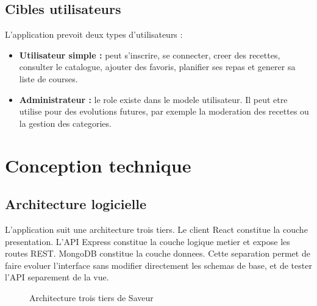 \documentclass[12pt,a4paper]{report}
\begin{document}
\section{Cibles utilisateurs}

L'application prevoit deux types d'utilisateurs :

\begin{itemize}[leftmargin=*]
  \item \textbf{Utilisateur simple :} peut s'inscrire, se connecter, creer des recettes, consulter le catalogue, ajouter des favoris, planifier ses repas et generer sa liste de courses.
  \item \textbf{Administrateur :} le role existe dans le modele utilisateur. Il peut etre utilise pour des evolutions futures, par exemple la moderation des recettes ou la gestion des categories.
\end{itemize}

\chapter{Conception technique}

\section{Architecture logicielle}

L'application suit une architecture trois tiers. Le client React constitue la couche presentation. L'API Express constitue la couche logique metier et expose les routes REST. MongoDB constitue la couche donnees. Cette separation permet de faire evoluer l'interface sans modifier directement les schemas de base, et de tester l'API separement de la vue.

\begin{figure}[H]
  \centering
  \caption{Architecture trois tiers de Saveur}
  \label{fig:architecture}
\end{figure}
\end{document}
